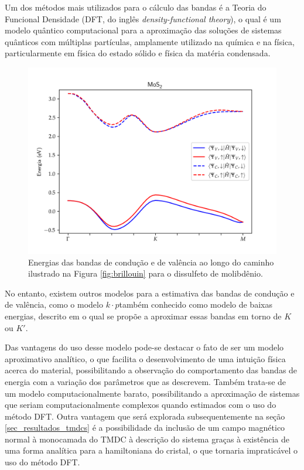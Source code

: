 Um dos métodos mais utilizados para o cálculo das bandas é a Teoria do Funcional
Densidade (DFT, do inglês \textit{density-functional theory}), o qual é um
modelo quântico computacional para a aproximação das soluções de sistemas
quânticos com múltiplas partículas, amplamente utilizado na química e na física,
particularmente em física do estado sólido e física da matéria condensada.

\begin{figure}[h]
  \centering
  \includegraphics[width=\textwidth]{imagens/mos2_bands.png}
  \caption{
    Energias das bandas de condução e de valência ao longo do caminho ilustrado
    na Figura \ref{fig:brillouin} para o dissulfeto de molibdênio.
  }
  \label{fig:mos2_bands}
\end{figure}

No entanto, existem outros modelos para a estimativa das bandas de condução e de
valência, como o modelo $k \cdot p$\trav também conhecido como modelo de baixas
energias, descrito em \cite{liu2013tmdc}\trav o qual se propõe a aproximar essas
bandas em torno de $K$ ou $K'$.

Das vantagens do uso desse modelo pode-se destacar o fato de ser um modelo
aproximativo analítico, o que facilita o desenvolvimento de uma intuição física
acerca do material, possibilitando a observação do comportamento das bandas de
energia com a variação dos parâmetros que as descrevem. Também trata-se de um
modelo computacionalmente barato, possibilitando a aproximação de sistemas que
seriam computacionalmente complexos quando estimados com o uso do método DFT.
Outra vantagem que será explorada subsequentemente na seção
\ref{sec_resultados_tmdcs} é a possibilidade da inclusão de um campo magnético
normal à monocamada do TMDC à descrição do sistema graças à existência de uma
forma analítica para a hamiltoniana do cristal, o que tornaria impraticável
o uso do método DFT.

